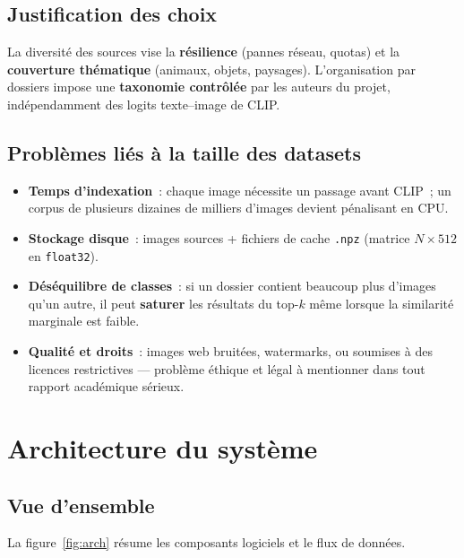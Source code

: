 \documentclass[11pt,a4paper,openany]{report}
\begin{document}
\section{Justification des choix}

La diversité des sources vise la \textbf{résilience} (pannes réseau, quotas) et la \textbf{couverture thématique} (animaux, objets, paysages). L'organisation par dossiers impose une \textbf{taxonomie contrôlée} par les auteurs du projet, indépendamment des logits texte–image de CLIP.

\section{Problèmes liés à la taille des datasets}

\begin{itemize}[leftmargin=*]
  \item \textbf{Temps d'indexation}~: chaque image nécessite un passage avant CLIP~; un corpus de plusieurs dizaines de milliers d'images devient pénalisant en CPU.
  \item \textbf{Stockage disque}~: images sources + fichiers de cache \texttt{.npz} (matrice $N \times 512$ en \texttt{float32}).
  \item \textbf{Déséquilibre de classes}~: si un dossier contient beaucoup plus d'images qu'un autre, il peut \textbf{saturer} les résultats du top-$k$ même lorsque la similarité marginale est faible.
  \item \textbf{Qualité et droits}~: images web bruitées, watermarks, ou soumises à des licences restrictives — problème éthique et légal à mentionner dans tout rapport académique sérieux.
\end{itemize}

\chapter{Architecture du système}
\label{chap:arch}

\section{Vue d'ensemble}

La figure~\ref{fig:arch} résume les composants logiciels et le flux de données.
\end{document}
